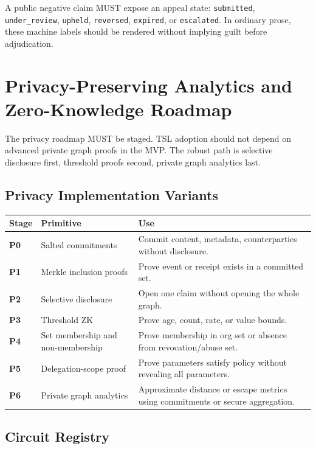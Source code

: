\documentclass[11pt]{article}
\newcommand{\TSL}{\textsc{TSL}}
\begin{document}
A public negative claim MUST expose an appeal state: \texttt{submitted}, \texttt{under\_review}, \texttt{upheld}, \texttt{reversed}, \texttt{expired}, or \texttt{escalated}. In ordinary prose, these machine labels should be rendered without implying guilt before adjudication.

\section{Privacy-Preserving Analytics and Zero-Knowledge Roadmap}

The privacy roadmap MUST be staged. \TSL{} adoption should not depend on advanced private graph proofs in the MVP. The robust path is selective disclosure first, threshold proofs second, private graph analytics last.

\subsection{Privacy Implementation Variants}

\begin{center}
\begin{tabularx}{\textwidth}{>{\bfseries}p{} p{} X}
\toprule
Stage & Primitive & Use \\
\midrule
P0 & Salted commitments & Commit content, metadata, counterparties without disclosure. \\
P1 & Merkle inclusion proofs & Prove event or receipt exists in a committed set. \\
P2 & Selective disclosure & Open one claim without opening the whole graph. \\
P3 & Threshold ZK & Prove age, count, rate, or value bounds. \\
P4 & Set membership and non-membership & Prove membership in org set or absence from revocation/abuse set. \\
P5 & Delegation-scope proof & Prove parameters satisfy policy without revealing all parameters. \\
P6 & Private graph analytics & Approximate distance or escape metrics using commitments or secure aggregation. \\
\bottomrule
\end{tabularx}
\end{center}

\subsection{Circuit Registry}
\end{document}
